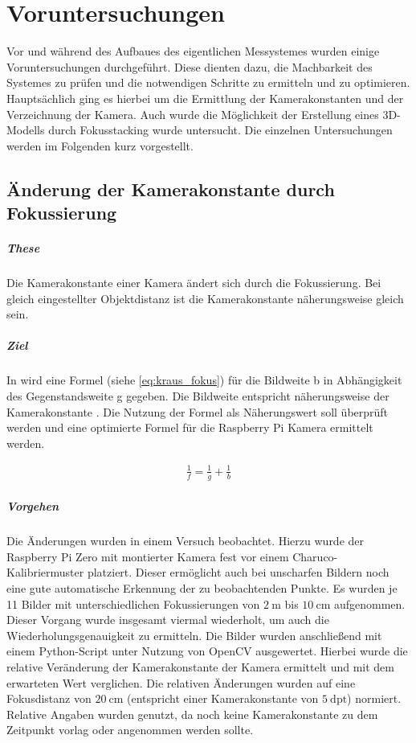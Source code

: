 \documentclass[./00PhotoBox.tex]{subfiles}
\begin{document}
\chapter{Voruntersuchungen}
Vor und während des Aufbaues des eigentlichen Messystemes wurden einige Voruntersuchungen durchgeführt. Diese dienten dazu, die Machbarkeit des Systemes zu prüfen und die notwendigen Schritte zu ermitteln und zu optimieren. Hauptsächlich ging es hierbei um die Ermittlung der Kamerakonstanten und der Verzeichnung der Kamera. Auch wurde die Möglichkeit der Erstellung eines 3D-Modells durch Fokusstacking wurde untersucht. Die einzelnen Untersuchungen werden im Folgenden kurz vorgestellt.

\section{Änderung der Kamerakonstante durch Fokussierung}

\paragraph{These}
Die Kamerakonstante einer Kamera ändert sich durch die Fokussierung. Bei gleich eingestellter Objektdistanz ist die Kamerakonstante näherungsweise gleich sein.

\paragraph{Ziel}
In \citet[S. 59]{kraus} wird eine Formel (siehe \autoref{eq:kraus_fokus}) für die \Gls{Bildweite} b in Abhängigkeit des Gegenstandsweite g gegeben. Die Bildweite entspricht näherungsweise der Kamerakonstante \citep[S. 59]{kraus}. Die Nutzung der Formel als Näherungswert soll überprüft werden und eine optimierte Formel für die Raspberry Pi Kamera ermittelt werden.

\begin{align}
    \frac{1}{f} = \frac{1}{g} + \frac{1}{b}
    \label{eq:kraus_fokus}
\end{align}

\paragraph{Vorgehen}
Die Änderungen wurden in einem Versuch beobachtet. Hierzu wurde der Raspberry Pi Zero mit montierter Kamera fest vor einem Charuco-Kalibriermuster platziert. Dieser ermöglicht auch bei unscharfen Bildern noch eine gute automatische Erkennung der zu beobachtenden Punkte. Es wurden je 11 Bilder mit unterschiedlichen Fokussierungen von $2~\text{m}$ bis  $10~\text{cm}$ aufgenommen. Dieser Vorgang wurde insgesamt viermal wiederholt, um auch die Wiederholungsgenauigkeit zu ermitteln. Die Bilder wurden anschließend mit einem Python-Script unter Nutzung von OpenCV ausgewertet. Hierbei wurde die relative Veränderung der Kamerakonstante der Kamera ermittelt und mit dem erwarteten Wert verglichen. Die relativen Änderungen wurden auf eine Fokusdistanz von $20~\text{cm}$ (entspricht einer Kamerakonstante von $5~\text{dpt}$) normiert. Relative Angaben wurden genutzt, da noch keine Kamerakonstante zu dem Zeitpunkt vorlag oder angenommen werden sollte.
\end{document}
